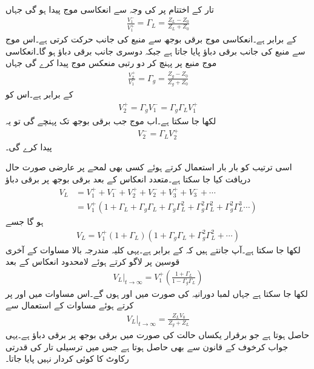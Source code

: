 تار کے اختتام پر  کی وجہ سے انعکاسی موج  پیدا ہو گی جہاں
\begin{align*}
\frac{V_1^-}{V_1^+}=\Gamma_L=\frac{Z_L-Z_0}{Z_L+Z_0}
\end{align*}
 کے برابر ہے۔انعکاسی موج برقی بوجھ سے منبع کی جانب حرکت کرتی ہے۔اس موج سے منبع کی جانب  برقی دباؤ پایا جاتا ہے جبکہ دوسری جانب  برقی دباؤ ہو گا۔انعکاسی موج  منبع پر پہنچ کر دو رتبی منعکس موج  پیدا کرے گی جہاں
\begin{align*}
\frac{V_2^+}{V_1^-}=\Gamma_g=\frac{Z_g-Z_0}{Z_g+Z_0}
\end{align*}
کے برابر ہے۔اس کو
\begin{align*}
V_2^+=\Gamma_g V_1^-=\Gamma_g \Gamma_L V_1^+
\end{align*}
لکھا جا سکتا ہے۔اب  موج جب برقی بوجھ تک پہنچے گی تو یہ 
\begin{align*}
V_2^-=\Gamma_L V_2^+
\end{align*}
 پیدا کرے گی۔

اسی ترتیب کو بار بار استعمال کرتے ہوئے کسی بھی لمحے پر عارضی صورت حال دریافت کیا جا سکتا ہے۔متعدد انعکاس کے بعد برقی بوجھ پر برقی دباؤ
\begin{align*}
V_L&=V_1^+ + V_1^- + V_2^+ + V_2^- + V_3^+ + V_3^- + \cdots\\
&=V_1^+ (1+\Gamma_L + \Gamma_g \Gamma_L + \Gamma_g \Gamma_L ^2+\Gamma_g^2 \Gamma_L^2+\Gamma_g^2 \Gamma_L^3\cdots )
\end{align*}
ہو گا جسے
\begin{align*}
V_L=V_1^+(1+\Gamma_L)(1+\Gamma_g \Gamma_L+\Gamma_g^2 \Gamma_L^2+\cdots)
\end{align*}
لکھا جا سکتا ہے۔آپ جانتے ہیں کہ  کے برابر ہے۔یہی کلیہ مندرجہ بالا مساوات کے آخری قوسین پر لاگو کرتے ہوئے  لامحدود انعکاس کے بعد
\begin{align*}
\left. V_L \right|_{t \to \infty}=V_1^+\left(\frac{1+\Gamma_L}{1-\Gamma_g \Gamma_L}\right) 
\end{align*}
لکھا جا سکتا ہے جہاں لمبا دورانیہ   کی صورت میں   اور  ہوں گے۔اس مساوات میں  اور  پر کرتے ہوئے مساوات  کے استعمال  سے
\begin{align*}
\left. V_L \right|_{t \to \infty}=\frac{Z_L V_0}{Z_g+Z_L}
\end{align*}
حاصل ہوتا ہے جو برقرار یکساں حالت کی صورت میں برقی بوجھ پر برقی دباؤ ہے۔یہی جواب کرخوف کے قانون سے بھی حاصل ہوتا ہے جس میں ترسیلی تار کی قدرتی رکاوٹ کا کوئی کردار نہیں پایا جاتا۔

